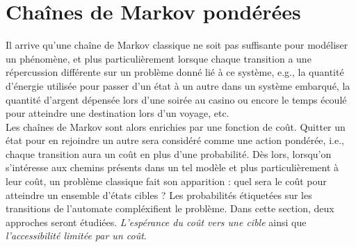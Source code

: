 \documentclass[12pt,a4paper]{report}
\theoremstyle{definition}%
\theoremstyle{remark}
\newtheorem{example}{Exemple}[chapter]
\newcommand{\eg}{e.g., }
\newcommand{\ie}{i.e., }
\let\labelitemi\labelitemii
\begin{document}
%

\section{Chaînes de Markov pondérées}
Il arrive qu'une chaîne de Markov classique ne soit pas suffisante pour modéliser un phénomène, et plus particulièrement lorsque chaque transition a une répercussion différente sur un problème donné lié à ce système, \eg la quantité d'énergie utilisée pour passer d'un état à un autre dans un système embarqué, la quantité d'argent dépensée lors d'une soirée au casino ou encore le temps écoulé pour atteindre une destination lors d'un voyage, etc. \\
Les chaînes de Markov sont alors enrichies par une fonction de coût. Quitter un état pour en rejoindre un autre sera considéré comme une action pondérée, \ie chaque transition aura un coût en plus d'une probabilité. Dès lors, lorsqu'on s'intéresse aux chemins présents dans un tel modèle et plus particulièrement à leur coût, un problème classique fait son apparition : quel sera le coût pour atteindre un ensemble d'états cibles ? Les probabilités étiquetées sur les transitions de l'automate compléxifient le problème. Dans cette section, deux approches seront étudiées. \textit{L'espérance du coût vers une cible} ainsi que \textit{l'accessibilité limitée par un coût}.
\end{document}
